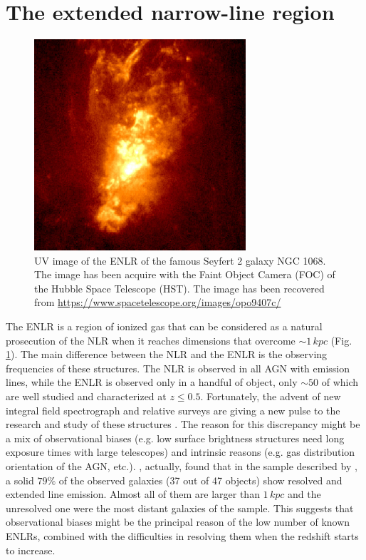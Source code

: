 \documentclass[../thesis.tex]{subfiles}
\begin{document}
\section{The extended narrow-line region}
\label{sec:ENLR}

\begin{figure}
\centering
\includegraphics[width=0.7\textwidth]{./images/opo9407c.jpg} 
\caption[]{UV image of the ENLR of the famous Seyfert 2 galaxy NGC 1068. The image has been acquire with the Faint Object Camera (FOC) of the Hubble Space Telescope (HST). The image has been recovered from \url{https://www.spacetelescope.org/images/opo9407c/}}
\label{fig:NGC1068}
\end{figure}

The ENLR is a region of ionized gas that can be considered as a natural prosecution of the NLR when it reaches dimensions that overcome $\sim 1\,\si{kpc}$ (Fig.\,\ref{fig:NGC1068}).
The main difference between the NLR and the ENLR is the observing frequencies of these structures.
The NLR is observed in all AGN with emission lines, while the ENLR is observed only in a handful of object,
only $\sim50$ of which are well studied and characterized at $z\le0.5$.
Fortunately, the advent of new integral field spectrograph and relative surveys \citep[e.g. MaNGA][]{Bundy15} are giving a new pulse to the research and study of these structures \citep{Husemann14,He18}.
The reason for this discrepancy might be a mix of observational biases (e.g. low surface brightness structures need long exposure times with large telescopes) and intrinsic reasons (e.g. gas distribution orientation of the AGN, etc.).
\citet{Mulchaey96b}, actually, found that in the sample described by \citet{Mulchaey96a}, a solid $79\%$ of the observed galaxies (37 out of 47 objects) show resolved and extended line emission. 
Almost all of them are larger than $1\,\si{kpc}$ and the unresolved one were the most distant galaxies of the sample.
This suggests that observational biases might be the principal reason of the low number of known ENLRs, combined with the difficulties in resolving them when the redshift starts to increase. 
\end{document}

